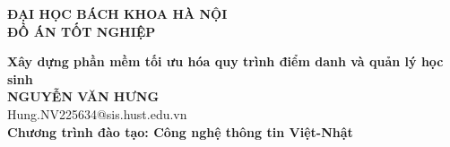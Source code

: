 \documentclass[DoAn.tex]{subfiles}
\begin{document}
\begin{titlepage}
  \thispagestyle{empty}
  \begin{center}

    {\textbf{\large{ĐẠI HỌC BÁCH KHOA HÀ NỘI}}}\\[4cm]

    {\textbf{\huge{ ĐỒ ÁN TỐT NGHIỆP}}}\\[1cm]
    {\textbf{\Large{Xây dựng phần mềm tối ưu hóa quy trình điểm danh và quản lý học sinh}}\\[1cm]
    
      {\textbf{\large{NGUYỄN VĂN HƯNG}}}\\
      {\large{Hung.NV225634@sis.hust.edu.vn}}\\[0.5cm]
      
      {\textbf{\large{Chương trình đào tạo: Công nghệ thông tin Việt-Nhật
          }}}\\
      
      \vspace{4cm}
      \begin{table}[H]
        \centering
      \end{table}}
  \end{center}



\end{titlepage}
\end{document}
